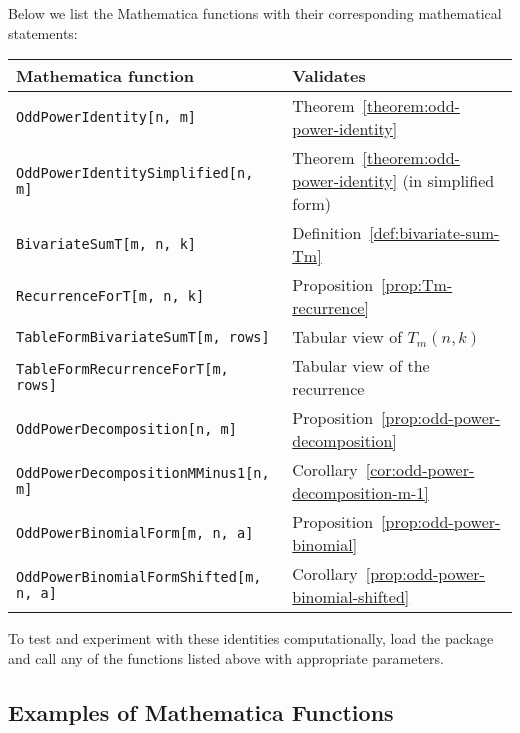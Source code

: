 Below we list the Mathematica functions with their corresponding mathematical statements:
\begin{center}
    \renewcommand{\arraystretch}{1.4}
    \begin{tabular}{ll}
        \toprule
        \textbf{Mathematica function}                 & \textbf{Validates}                                            \\
        \midrule
        \texttt{OddPowerIdentity[n, m]}               & Theorem~\ref{theorem:odd-power-identity}                      \\
        \texttt{OddPowerIdentitySimplified[n, m]}     & Theorem~\ref{theorem:odd-power-identity} (in simplified form) \\
        \texttt{BivariateSumT[m, n, k]}               & Definition~\ref{def:bivariate-sum-Tm}                         \\
        \texttt{RecurrenceForT[m, n, k]}              & Proposition~\ref{prop:Tm-recurrence}                          \\
        \texttt{TableFormBivariateSumT[m, rows]}      & Tabular view of $T_m(n,k)$                                    \\
        \texttt{TableFormRecurrenceForT[m, rows]}     & Tabular view of the recurrence                                \\
        \texttt{OddPowerDecomposition[n, m]}          & Proposition~\ref{prop:odd-power-decomposition}                \\
        \texttt{OddPowerDecompositionMMinus1[n, m]}   & Corollary~\ref{cor:odd-power-decomposition-m-1}               \\
        \texttt{OddPowerBinomialForm[m, n, a]}        & Proposition~\ref{prop:odd-power-binomial}                     \\
        \texttt{OddPowerBinomialFormShifted[m, n, a]} & Corollary~\ref{prop:odd-power-binomial-shifted}               \\
        \bottomrule
    \end{tabular}
\end{center}
To test and experiment with these identities computationally, load the package and call any of the
functions listed above with appropriate parameters.

\subsection*{Examples of Mathematica Functions}

